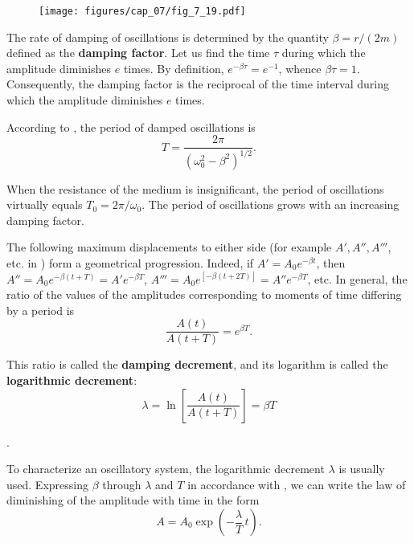 \begin{figure}[t]
	\begin{center}
		\texttt{[image: figures/cap\_07/fig\_7\_19.pdf]}
		\caption[]{}
		\label{fig:7_19}
	\end{center}
	\vspace{-0.8cm}
\end{figure}

The rate of damping of oscillations is determined by the quantity $\beta=r/(2m)$ defined as the \textbf{damping factor}. Let us find the time $\tau$ during which the amplitude diminishes $e$ times. By definition, $e^{-\beta\tau}=e^{-1}$, whence $\beta\tau=1$. Consequently, the damping factor is the reciprocal of the time interval during which the amplitude diminishes $e$ times.

According to , the period of damped oscillations is
\begin{equation}\label{eq:7_103}
	T = \frac{2\pi}{\left(\omega_0^2 - \beta^2\right)^{1/2}}.
\end{equation}

\noindent
When the resistance of the medium is insignificant, the period of oscillations virtually equals $T_0=2\pi/\omega_0$. The period of oscillations grows with an increasing damping factor.

The following maximum displacements to either side (for example $A', A'', A'''$, etc. in ) form a geometrical progression. Indeed, if $A'=A_0e^{-\beta t}$, then $A''=A_0e^{-\beta(t+T)}=A'e^{-\beta T}$, $A'''=A_0e^{[-\beta(t+2T)]}=A''e^{-\beta T}$, etc. In general, the ratio of the values of the amplitudes corresponding to moments of time differing by a period is
\begin{equation*}
	\frac{A(t)}{A(t+T)} = e^{\beta T}.
\end{equation*}

\noindent
This ratio is called the \textbf{damping decrement}, and its logarithm is called the \textbf{logarithmic decrement}:
\begin{equation}\label{eq:7_104}
	\lambda = \ln\left[\frac{A(t)}{A(t+T)}\right] = \beta T
\end{equation}

.

To characterize an oscillatory system, the logarithmic decrement $\lambda$ is usually used. Expressing $\beta$ through $\lambda$ and $T$ in accordance with , we can write the law of diminishing of the amplitude with time in the form
\begin{equation}\label{eq:7_105}
	A = A_0\exp\left(-\frac{\lambda}{T}\,t\right).
\end{equation}

